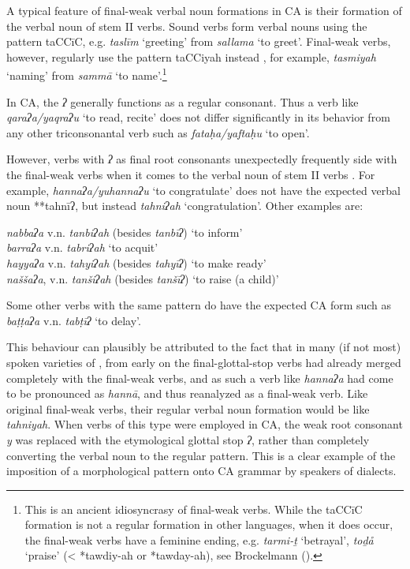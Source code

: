 \documentclass[output=paper]{langsci/langscibook}
\begin{document}
A typical feature of final-weak verbal noun formations in CA is their {formation} of the verbal noun of {stem} II verbs. Sound verbs form verbal nouns using the pattern taCCīC, e.g. \textit{taslīm} ‘greeting’ from \textit{sallama} ‘to greet’. Final-weak verbs, however, regularly use the pattern taCCiyah instead \citep[44]{Fischer2002}, for example, \textit{tasmiyah} ‘naming’ from \textit{sammā} ‘to name’.\footnote{This is an ancient idiosyncrasy of final-weak verbs. While the taCCīC {formation} is not a regular {formation} in other  languages, when it does occur, the final-weak verbs have a feminine ending, e.g.  \textit{tarmi-ṯ} ‘betrayal’, \textit{toḏå} ‘praise’ (< *tawdiy-ah or *tawday-ah), see Brockelmann (\citeyear[385--387]{Brockelmann1908}).} 

In CA, the \textit{ʔ} generally functions as a regular consonant. Thus a verb like \textit{qaraʔa/yaqraʔu} ‘to read, recite’ does not differ significantly in its behavior from any other {triconsonantal} verb such as \textit{fataḥa/yaftaḥu} ‘to open’. 

However, verbs with \textit{ʔ} as final {root} consonants unexpectedly frequently side with the final-weak verbs when it comes to the verbal noun of {stem} II verbs \citep[128]{Fischer2002}. For example, \textit{hannaʔa/yuhannaʔu} ‘to congratulate’ does not have the expected verbal noun **tahnīʔ, but instead \textit{tahniʔah} ‘congratulation’. Other examples are:

\ea
\ea\textit{nabbaʔa} v.n. \textit{tanbiʔah} (besides \textit{tanbīʔ}) ‘to inform’\\
\ex\textit{barraʔa} v.n. \textit{tabriʔah} ‘to acquit’\\
\ex\textit{hayyaʔa} v.n. \textit{tahyiʔah} (besides \textit{tahyīʔ}) ‘to make ready’\\
\ex\textit{naššaʔa}, v.n. \textit{tanšiʔah} (besides \textit{tanšīʔ}) ‘to raise (a child)’
\z
\z

Some other verbs with the same pattern do have the expected CA form such as \textit{baṭṭaʔa} v.n. \textit{tabṭīʔ} ‘to delay’.

This behaviour can plausibly be attributed to the fact that in many (if not most) spoken varieties of , from early on the final-glottal-stop verbs had already {merged} completely with the final-weak verbs, and as such a verb like \textit{hannaʔa} had come to be pronounced as \textit{hannā}, and thus reanalyzed as a final-weak verb. Like original final-weak verbs, their regular verbal noun {formation} would be like \textit{tahniyah}. When verbs of this type were employed in CA, the weak {root} consonant \textit{y} was replaced with the etymological glottal stop \textit{ʔ}, rather than completely converting the verbal noun to the regular pattern. This is a clear example of the {imposition} of a morphological pattern onto CA grammar by speakers of  dialects.
\end{document}
